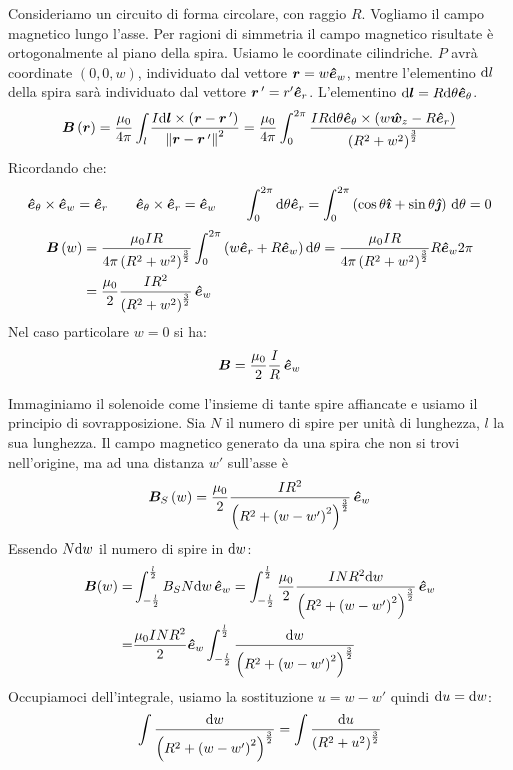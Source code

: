 \begin{Es}
Consideriamo un circuito di forma circolare, con raggio $R$. Vogliamo il campo magnetico lungo l'asse. Per ragioni di simmetria il campo magnetico risultate è ortogonalmente al piano della spira. Usiamo le coordinate cilindriche. $P$ avrà coordinate $(0,0,w)$, individuato dal vettore $\boldsymbol{r}=w \boldsymbol{\hat {e}}_w$, mentre l'elementino $\mathrm{d} l$ della spira sarà individuato dal vettore $\boldsymbol{r}\,'=r'\boldsymbol{\hat {e}}_r$. L'elementino $\mathrm{d}\boldsymbol{l}=R\mathrm{d}\theta\boldsymbol{\hat {e}}_\theta$.
\begin{equation*}\boldsymbol{B}\left(\boldsymbol{r}\right)=\frac{\mu_0}{4\pi}\int_l\frac{I\mathrm{d}\boldsymbol{l}\times\left(\boldsymbol{r}-\boldsymbol{r}\,'\right)}{\left\lVert\boldsymbol{r}-\boldsymbol{r}\,'\right\rVert^2}=\frac{\mu_0}{4\pi}\int_0^{2\pi}\frac{IR\mathrm{d}\theta\boldsymbol{\hat {e}}_\theta\times\left(w\boldsymbol{\hat {w}}_z-R\boldsymbol{\hat {e}}_r\right)}{\left(R^2+w^2\right)^{\frac{3}{2}}}\end{equation*}
Ricordando che:
\begin{equation*}\boldsymbol{\hat {e}}_\theta\times\boldsymbol{\hat {e}}_w=\boldsymbol{\hat {e}}_r\qquad \boldsymbol{\hat {e}}_\theta\times\boldsymbol{\hat {e}}_r=\boldsymbol{\hat {e}}_w\qquad \int_0^{2\pi} \mathrm{d}\theta\boldsymbol{\hat {e}}_r=\int_0^{2\pi}\left(\cos\theta\boldsymbol{\hat {\imath}}+\sin\theta\boldsymbol{\hat {\jmath}}\right)\,\mathrm{d} \theta=0\end{equation*}
\begin{align*}
\boldsymbol{B}\left(w\right)&=\frac{\mu_0IR}{4\pi\left(R^2+w^2\right)^{\frac{3}{2}}}\int_0^{2\pi}\left(w\boldsymbol{\hat {e}}_r+R\boldsymbol{\hat {e}}_w\right)\mathrm{d}\theta=\frac{\mu_0IR}{4\pi\left(R^2+w^2\right)^{\frac{3}{2}}}R\boldsymbol{\hat {e}}_w 2\pi\\
&=\frac{\mu_0}{2}\frac{IR^2}{\left(R^2+w^2\right)^{\frac{3}{2}}}\,\boldsymbol{\hat {e}}_w
\end{align*}
Nel caso particolare $w=0$ si ha:
\begin{equation*}\boldsymbol{B}=\frac{\mu_0}{2}\frac{I}{R}\,\boldsymbol{\hat {e}}_w\end{equation*}
\end{Es}
\begin{Es}
Immaginiamo il solenoide come l'insieme di tante spire affiancate e usiamo il principio di sovrapposizione. Sia $N$ il numero di spire per unità di lunghezza, $l$ la sua lunghezza. Il campo magnetico generato da una spira che non si trovi nell'origine, ma ad una distanza $w'$ sull'asse è 
\begin{equation*}\boldsymbol{B}_S\left(w\right)=\frac{\mu_0}{2}\frac{IR^2}{\left(R^2+\left(w-w'\right)^2\right)^{\frac{3}{2}}}\,\boldsymbol{\hat {e}}_w\end{equation*}
Essendo $N\mathrm{d} w$ il numero di spire in $\mathrm{d} w$:
\begin{align*}
\boldsymbol{B}(w)=&\int_{-\frac{l}{2}}^{\frac{l}{2}}B_SN\mathrm{d} w\,\boldsymbol{\hat {e}}_w=\int_{-\frac{l}{2}}^{\frac{l}{2}}\frac{\mu_0}{2}\frac{INR^2\mathrm{d} w}{\left(R^2+\left(w-w'\right)^2\right)^{\frac{3}{2}}}\,\boldsymbol{\hat {e}}_w\\
=&\frac{\mu_0INR^2}{2}\boldsymbol{\hat {e}}_w\int_{-\frac{l}{2}}^{\frac{l}{2}}\frac{\mathrm{d} w}{\left(R^2+\left(w-w'\right)^2\right)^{\frac{3}{2}}}
\end{align*}
Occupiamoci dell'integrale, usiamo la sostituzione $u=w-w'$ quindi $\mathrm{d} u=\mathrm{d} w$:
\begin{equation*}\int\frac{\mathrm{d} w}{\left(R^2+\left(w-w'\right)^2\right)^{\frac{3}{2}}}=\int\frac{\mathrm{d} u}{\left(R^2+u^2\right)^{\frac{3}{2}}}\end{equation*}
\end{Es}
